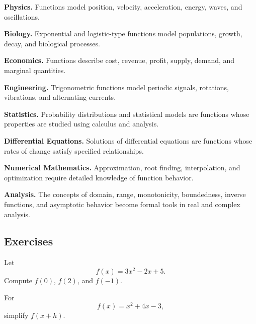 \begin{applicationbox}
\textbf{Physics.}
Functions model position, velocity, acceleration, energy, waves, and
oscillations.

\medskip

\textbf{Biology.}
Exponential and logistic-type functions model populations, growth, decay,
and biological processes.

\medskip

\textbf{Economics.}
Functions describe cost, revenue, profit, supply, demand, and marginal
quantities.

\medskip

\textbf{Engineering.}
Trigonometric functions model periodic signals, rotations, vibrations, and
alternating currents.

\medskip

\textbf{Statistics.}
Probability distributions and statistical models are functions whose
properties are studied using calculus and analysis.

\medskip

\textbf{Differential Equations.}
Solutions of differential equations are functions whose rates of change
satisfy specified relationships.

\medskip

\textbf{Numerical Mathematics.}
Approximation, root finding, interpolation, and optimization require detailed
knowledge of function behavior.

\medskip

\textbf{Analysis.}
The concepts of domain, range, monotonicity, boundedness, inverse functions,
and asymptotic behavior become formal tools in real and complex analysis.
\end{applicationbox}

\subsection{Exercises}
\label{subsec:precalculus-exercises}

\begin{exercise}[1]
Let
\[ f(x)=3x^2-2x+5. \]
Compute \(f(0)\), \(f(2)\), and \(f(-1)\).
\end{exercise}

\begin{exercise}[2]
For
\[ f(x)=x^2+4x-3, \]
simplify \(f(x+h)\).
\end{exercise}

